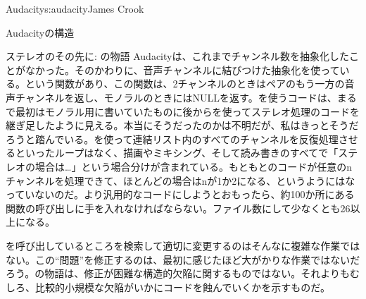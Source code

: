 \begin{aosachapter}{Audacity}{s:audacity}{James Crook}
\begin{aosasect1}{Audacityの構造}
\begin{aosabox}{ステレオのその先に: の物語}
Audacityは、これまでチャンネル数を抽象化したことがなかった。そのかわりに、音声チャンネルに結びつけた抽象化を使っている。という関数があり、この関数は、2チャンネルのときはペアのもう一方の音声チャンネルを返し、モノラルのときにはNULLを返す。を使うコードは、まるで最初はモノラル用に書いていたものに後からを使ってステレオ処理のコードを継ぎ足したように見える。本当にそうだったのかは不明だが、私はきっとそうだろうと踏んでいる。を使って連結リスト内のすべてのチャンネルを反復処理させるといったループはなく、描画やミキシング、そして読み書きのすべてで「ステレオの場合は…」という場合分けが含まれている。もともとのコードが任意のnチャンネルを処理できて、ほとんどの場合はnが1か2になる、というようにはなっていないのだ。より汎用的なコードにしようとおもったら、約100か所にある関数の呼び出しに手を入れなければならない。ファイル数にして少なくとも26以上になる。

を呼び出しているところを検索して適切に変更するのはそんなに複雑な作業ではない。この``問題''を修正するのは、最初に感じたほど大がかりな作業ではないだろう。の物語は、修正が困難な構造的欠陥に関するものではない。それよりもむしろ、比較的小規模な欠陥がいかにコードを蝕んでいくかを示すものだ。


\end{aosabox}
\end{aosasect1}
\end{aosachapter}

